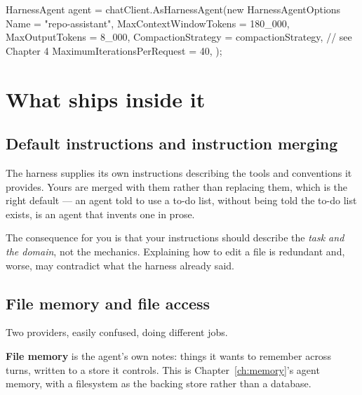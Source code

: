 \begin{csharp}[caption={The configuration that actually matters}, label={lst:harness-options}]
HarnessAgent agent = chatClient.AsHarnessAgent(new HarnessAgentOptions
{
    Name = "repo-assistant",
    MaxContextWindowTokens = 180_000,
    MaxOutputTokens = 8_000,
    CompactionStrategy = compactionStrategy,   // see Chapter 4
    MaximumIterationsPerRequest = 40,
});
\end{csharp}

\section{What ships inside it}
\label{sec:harness-inside}

\subsection{Default instructions and instruction merging}

The harness supplies its own instructions describing the tools and conventions it
provides. Yours are merged with them rather than replacing them, which is the
right default --- an agent told to use a to-do list, without being told the
to-do list exists, is an agent that invents one in prose.

The consequence for you is that your instructions should describe the \emph{task
and the domain}, not the mechanics. Explaining how to edit a file is redundant
and, worse, may contradict what the harness already said.

\subsection{File memory and file access}

Two providers, easily confused, doing different jobs.

\textbf{File memory} is the agent's own notes: things it wants to remember across
turns, written to a store it controls. This is Chapter~\ref{ch:memory}'s agent
memory, with a filesystem as the backing store rather than a database.

